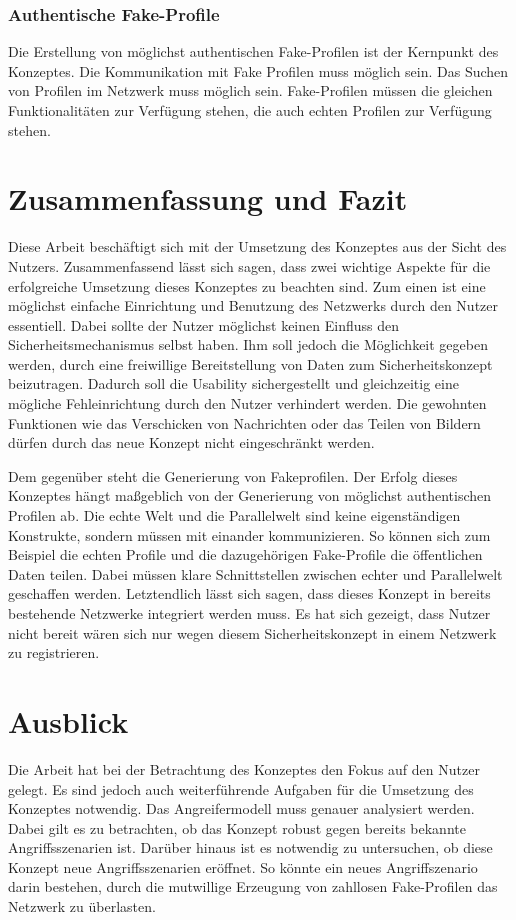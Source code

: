 \documentclass{sigchi}
\begin{document}
\subsubsection{Authentische Fake-Profile}
Die Erstellung von möglichst authentischen Fake-Profilen ist der Kernpunkt des Konzeptes. Die Kommunikation mit Fake Profilen muss möglich sein. Das Suchen von Profilen im Netzwerk muss möglich sein. Fake-Profilen müssen die gleichen Funktionalitäten zur Verfügung stehen, die auch echten Profilen zur Verfügung stehen.

\section{Zusammenfassung und Fazit}
Diese Arbeit beschäftigt sich mit der Umsetzung des Konzeptes aus der Sicht des Nutzers. Zusammenfassend lässt sich sagen, dass zwei wichtige Aspekte für die erfolgreiche Umsetzung dieses Konzeptes zu beachten sind. Zum einen ist eine möglichst einfache Einrichtung und Benutzung des Netzwerks durch den Nutzer essentiell. Dabei sollte der Nutzer möglichst keinen Einfluss den Sicherheitsmechanismus selbst haben. Ihm soll jedoch die Möglichkeit gegeben werden, durch eine freiwillige Bereitstellung von Daten zum Sicherheitskonzept beizutragen. Dadurch soll die Usability sichergestellt und gleichzeitig eine mögliche Fehleinrichtung durch den Nutzer verhindert werden. Die gewohnten Funktionen wie das Verschicken von Nachrichten oder das Teilen von Bildern dürfen durch das neue Konzept nicht eingeschränkt werden. 

Dem gegenüber steht die Generierung von Fakeprofilen. Der Erfolg dieses Konzeptes hängt maßgeblich von der Generierung von möglichst authentischen Profilen ab. Die echte Welt und die Parallelwelt sind keine eigenständigen Konstrukte, sondern müssen mit einander kommunizieren. So können sich zum Beispiel die echten Profile und die dazugehörigen Fake-Profile die öffentlichen Daten teilen. Dabei müssen klare Schnittstellen zwischen echter und Parallelwelt geschaffen werden. Letztendlich lässt sich sagen, dass dieses Konzept in bereits bestehende Netzwerke integriert werden muss. Es hat sich gezeigt, dass Nutzer nicht bereit wären sich nur wegen diesem Sicherheitskonzept in einem Netzwerk zu registrieren. 
\section{Ausblick}
Die Arbeit hat bei der Betrachtung des Konzeptes den Fokus auf den Nutzer gelegt. Es sind jedoch auch weiterführende Aufgaben für die Umsetzung des Konzeptes notwendig. Das Angreifermodell muss genauer analysiert werden. Dabei gilt es zu betrachten, ob das Konzept robust gegen bereits bekannte Angriffsszenarien ist. Darüber hinaus ist es notwendig zu untersuchen, ob diese Konzept neue Angriffsszenarien eröffnet. So könnte ein neues Angriffszenario darin bestehen, durch die mutwillige Erzeugung von zahllosen Fake-Profilen das Netzwerk zu überlasten. 
\end{document}
